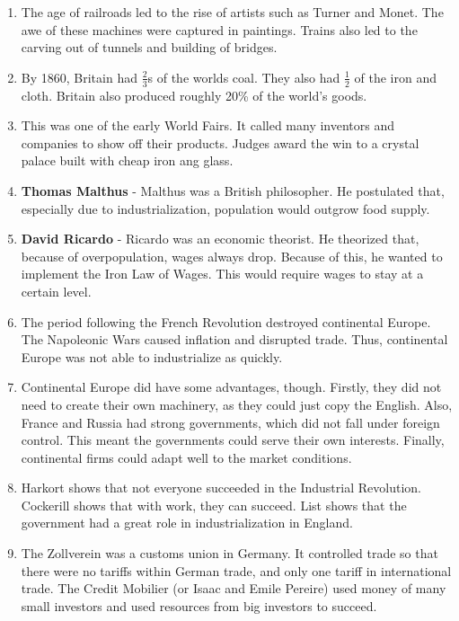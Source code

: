 \documentclass[12pt]{article}
\begin{document}
\begin{enumerate}
\item The age of railroads led to the rise of artists such as Turner and Monet. The awe of these machines were captured in paintings. Trains also led to the carving out of tunnels and building of bridges.

\item By 1860, Britain had $\frac{2}{3}$s of the worlds coal. They also had $\frac{1}{2}$ of the iron and cloth. Britain also produced roughly 20\% of the world's goods.

\item This was one of the early World Fairs. It called many inventors and companies to show off their products. Judges award the win to a crystal palace built with cheap iron ang glass.

\item \textbf{Thomas Malthus} - Malthus was a British philosopher. He postulated that, especially due to industrialization, population would outgrow food supply.

\item \textbf{David Ricardo} - Ricardo was an economic theorist. He theorized that, because of overpopulation, wages always drop. Because of this, he wanted to implement the Iron Law of Wages. This would require wages to stay at a certain level.

\item The period following the French Revolution destroyed continental Europe. The Napoleonic Wars caused inflation and disrupted trade. Thus, continental Europe was not able to industrialize as quickly.

\item Continental Europe did have some advantages, though. Firstly, they did not need to create their own machinery, as they could just copy the English. Also, France and Russia had strong governments, which did not fall under foreign control. This meant the governments could serve their own interests. Finally, continental firms could adapt well to the market conditions.

\item Harkort shows that not everyone succeeded in the Industrial Revolution. Cockerill shows that with work, they can succeed. List shows that the government had a great role in industrialization in England.

\item The Zollverein was a customs union in Germany. It controlled trade so that there were no tariffs within German trade, and only one tariff in international trade. The Credit Mobilier (or Isaac and Emile Pereire) used money of many small investors and used resources from big investors to succeed.


\end{enumerate}
\end{document}
